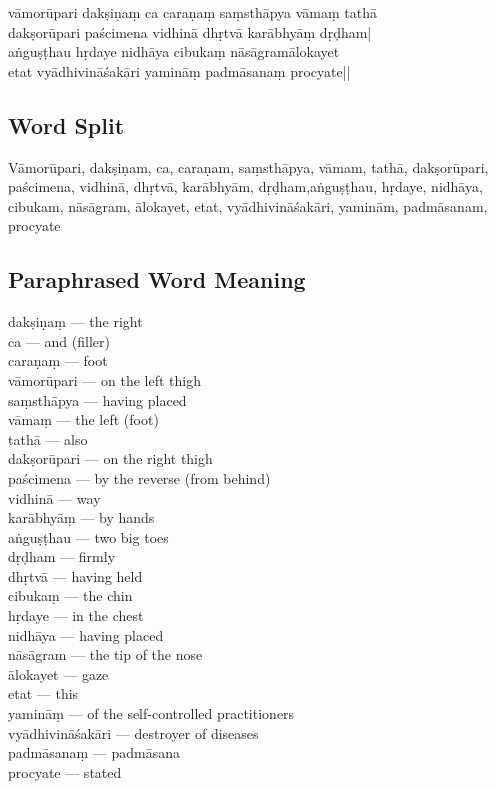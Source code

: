 \begin{shloka}
vāmorūpari dakṣiṇaṃ ca caraṇaṃ saṃsthāpya vāmaṃ tathā\\
dakṣorūpari paścimena vidhinā dhṛtvā karābhyāṃ dṛḍham|\\
aṅguṣṭhau hṛdaye nidhāya cibukaṃ nāsāgramālokayet\\
etat vyādhivināśakāri yamināṃ padmāsanaṃ procyate||
\end{shloka}
\vspace{-10pt}

\subsection*{Word Split}
\vspace{-10pt}

Vāmorūpari, dakṣiṇam, ca, caraṇam, saṃsthāpya, vāmam, tathā, dakṣorūpari, paścimena, vidhinā, dhṛtvā, karābhyām, dṛḍham,aṅguṣṭhau, hṛdaye, nidhāya, cibukam, nāsāgram, ālokayet, etat, vyādhivināśakāri, yaminām, padmāsanam, procyate
\vspace{-10pt}

\subsection*{Paraphrased Word Meaning}
\vspace{-10pt}

\begin{multicols}{2}
\itemsep=0pt
dakṣiṇaṃ --- the right  \\
ca ---  and (filler)  \\
caraṇaṃ ---  foot  \\
vāmorūpari ---  on the left thigh  \\
saṃsthāpya ---  having placed  \\
vāmaṃ ---  the left (foot) \\
tathā ---  also \\
dakṣorūpari --- on the right thigh \\
paścimena ---  by the reverse (from behind)  \\
vidhinā ---  way \\
karābhyāṃ --- by hands \\
aṅguṣṭhau --- two big toes \\
dṛḍham --- firmly \\
dhṛtvā ---  having held  \\
cibukaṃ ---  the chin \\
hṛdaye ---  in the chest \\
nidhāya ---  having placed \\
nāsāgram --- the tip of the nose  \\
ālokayet ---  gaze \\
etat ---  this \\
yamināṃ ---  of the self-controlled practitioners \\
vyādhivināśakāri ---  destroyer of diseases \\
padmāsanaṃ ---  padmāsana \\
procyate --- stated
\end{multicols}

